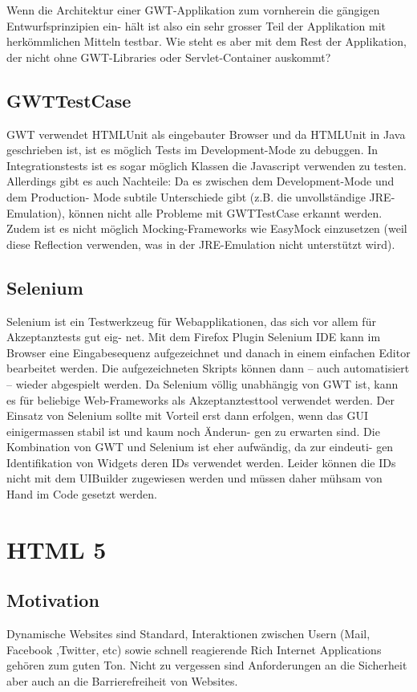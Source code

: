 \documentclass[a4paper,10pt]{scrreprt}
\begin{document}
Wenn die Architektur einer GWT-Applikation zum vornherein die gängigen Entwurfsprinzipien ein-
hält ist also ein sehr grosser Teil der Applikation mit herkömmlichen Mitteln testbar. Wie steht es
aber mit dem Rest der Applikation, der nicht ohne GWT-Libraries oder Servlet-Container auskommt?

\section{GWTTestCase}
GWT verwendet HTMLUnit als eingebauter Browser und da HTMLUnit in Java geschrieben ist, ist es
möglich Tests im Development-Mode zu debuggen. In Integrationstests ist es sogar möglich Klassen
die Javascript verwenden zu testen.
Allerdings gibt es auch Nachteile: Da es zwischen dem Development-Mode und dem Production-
Mode subtile Unterschiede gibt (z.B. die unvollständige JRE-Emulation), können nicht alle Probleme
mit GWTTestCase erkannt werden. Zudem ist es nicht möglich Mocking-Frameworks wie EasyMock
einzusetzen (weil diese Reflection verwenden, was in der JRE-Emulation nicht unterstützt wird).
\section{Selenium}
Selenium ist ein Testwerkzeug für Webapplikationen, das sich vor allem für Akzeptanztests gut eig-
net. Mit dem Firefox Plugin Selenium IDE kann im Browser eine Eingabesequenz aufgezeichnet und
danach in einem einfachen Editor bearbeitet werden. Die aufgezeichneten Skripts können dann –
auch automatisiert – wieder abgespielt werden. Da Selenium völlig unabhängig von GWT ist, kann es
für beliebige Web-Frameworks als Akzeptanztesttool verwendet werden. Der Einsatz von Selenium
sollte mit Vorteil erst dann erfolgen, wenn das GUI einigermassen stabil ist und kaum noch Änderun-
gen zu erwarten sind. Die Kombination von GWT und Selenium ist eher aufwändig, da zur eindeuti-
gen Identifikation von Widgets deren IDs verwendet werden. Leider können die IDs nicht mit dem
UIBuilder zugewiesen werden und müssen daher mühsam von Hand im Code gesetzt werden.
\chapter{HTML 5}
\section{Motivation}
Dynamische Websites sind Standard,
Interaktionen zwischen Usern (Mail, Facebook ,Twitter, etc) sowie schnell reagierende Rich
Internet Applications gehören zum guten Ton. Nicht zu vergessen sind Anforderungen an die
Sicherheit aber auch an die Barrierefreiheit von Websites.
\end{document}
